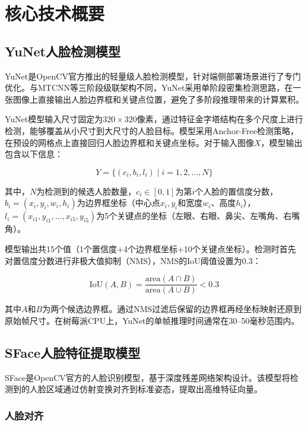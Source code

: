 \chapter{核心技术概要}

\section{YuNet人脸检测模型}

YuNet是OpenCV官方推出的轻量级人脸检测模型，针对端侧部署场景进行了专门优化。与MTCNN等三阶段级联架构不同，YuNet采用单阶段密集检测思路，在一张图像上直接输出人脸边界框和关键点位置，避免了多阶段推理带来的计算累积。

YuNet模型输入尺寸固定为$320 \times 320$像素，通过特征金字塔结构在多个尺度上进行检测，能够覆盖从小尺寸到大尺寸的人脸目标。模型采用Anchor-Free检测策略，在预设的网格点上直接回归人脸边界框和关键点坐标。对于输入图像$X$，模型输出包含以下信息：

\begin{equation}
    Y = \{ (c_i, b_i, l_i) \mid i = 1, 2, \dots, N \}
\end{equation}

其中，$N$为检测到的候选人脸数量，$c_i \in [0, 1]$为第$i$个人脸的置信度分数，$b_i = (x_i, y_i, w_i, h_i)$为边界框坐标（中心点$x_i, y_i$和宽度$w_i$、高度$h_i$），$l_i = (x_{i1}, y_{i1}, \dots, x_{i5}, y_{i5})$为5个关键点的坐标（左眼、右眼、鼻尖、左嘴角、右嘴角）。

模型输出共15个值（1个置信度+4个边界框坐标+10个关键点坐标）。检测时首先对置信度分数进行非极大值抑制（NMS），NMS的IoU阈值设置为0.3：

\begin{equation}
    \text{IoU}(A, B) = \frac{\text{area}(A \cap B)}{\text{area}(A \cup B)} < 0.3
\end{equation}

其中$A$和$B$为两个候选边界框。通过NMS过滤后保留的边界框再经坐标映射还原到原始帧尺寸。在树莓派CPU上，YuNet的单帧推理时间通常在30--50毫秒范围内。

\section{SFace人脸特征提取模型}

SFace是OpenCV官方的人脸识别模型，基于深度残差网络架构设计。该模型将检测到的人脸区域通过仿射变换对齐到标准姿态，提取出高维特征向量。

\subsection{人脸对齐}


